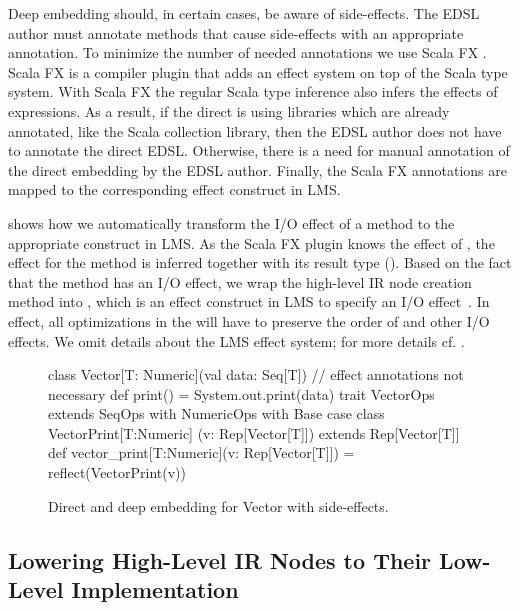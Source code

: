 Deep embedding should, in certain cases, be aware of side-effects. The EDSL
author must annotate methods that cause side-effects with an appropriate
annotation. To minimize the number of needed annotations we use Scala FX
\cite{rytz2012lightweight}. Scala FX is a compiler plugin that adds an effect
system on top of the Scala type system. With Scala FX the regular Scala type
inference also infers the effects of expressions. As a result, if the direct
\edsl is using libraries which are already annotated, like the Scala collection
library, then the EDSL author does not have to annotate the direct EDSL.
Otherwise, there is a need for manual annotation of the direct embedding by
the EDSL author. Finally, the Scala FX annotations are mapped to the
corresponding effect construct in LMS.

 shows how we automatically transform the I/O
effect of a  method to the appropriate construct in LMS. As the
Scala FX plugin knows the effect of , the effect for
the  method is inferred together with its result type
(). Based on the fact that the  method has an I/O
effect, we wrap the high-level IR node creation method into
, which is an effect construct in LMS to specify an I/O
effect~\cite{rompf_building-blocks_2011}. In effect, all optimizations in the \edsl
will have to preserve the order of  and other I/O effects. We omit details
about the LMS effect system; for more details cf. \cite{rompf_building-blocks_2011}.

\begin{figure}
\begin{listingtiny}
class Vector[T: Numeric](val data: Seq[T]) {
  // effect annotations not necessary
  def print() = System.out.print(data)
}
trait VectorOps extends SeqOps with
  NumericOps with Base {
  case class VectorPrint[T:Numeric]
    (v: Rep[Vector[T]]) extends Rep[Vector[T]]
  def vector_print[T:Numeric](v: Rep[Vector[T]]) =
    reflect(VectorPrint(v))
}
\end{listingtiny}
\caption{\label{lst:vector_deep_fx} Direct and deep embedding for Vector with side-effects.}
\end{figure}

\subsection{Lowering High-Level IR Nodes to Their Low-Level Implementation}
\label{sec:yy-impl-lower}

